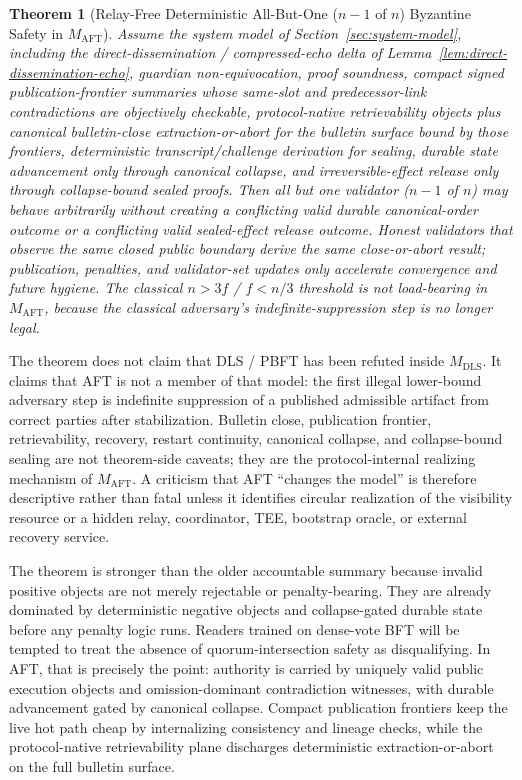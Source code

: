 \documentclass[11pt]{article}
\newtheorem{theorem}{Theorem}
\newcommand{\AFT}{\textsc{AFT}}
\begin{document}
\begin{theorem}[Relay-Free Deterministic All-But-One (\(n-1\) of \(n\)) Byzantine Safety in \(M_{\mathrm{AFT}}\)]
Assume the system model of Section~\ref{sec:system-model}, including the
direct-dissemination / compressed-echo delta of
Lemma~\ref{lem:direct-dissemination-echo}, guardian
non-equivocation, proof soundness, compact signed publication-frontier
summaries whose same-slot and predecessor-link contradictions are objectively
checkable, protocol-native retrievability objects plus canonical
bulletin-close extraction-or-abort for the bulletin surface bound by those
frontiers,
deterministic transcript/challenge derivation for sealing, durable state
advancement only through canonical collapse, and irreversible-effect release
only through collapse-bound sealed proofs. Then all but one validator
(\(n-1\) of \(n\))
may behave arbitrarily without creating a conflicting valid durable
canonical-order outcome or a conflicting valid sealed-effect release outcome.
Honest validators that observe the same closed public boundary derive the same
close-or-abort result; publication, penalties, and validator-set updates only
accelerate convergence and future hygiene. The classical \(n > 3f\) /
\(f < n/3\) threshold is not load-bearing in \(M_{\mathrm{AFT}}\), because the
classical adversary's indefinite-suppression step is no longer legal.
\end{theorem}

The theorem does not claim that DLS / PBFT has been refuted inside
\(M_{\mathrm{DLS}}\). It claims that \AFT{} is not a member of that model:
the first illegal lower-bound adversary step is indefinite suppression of a
published admissible artifact from correct parties after stabilization.
Bulletin close, publication frontier, retrievability, recovery, restart
continuity, canonical collapse, and collapse-bound sealing are not
theorem-side caveats; they are the protocol-internal realizing mechanism of
\(M_{\mathrm{AFT}}\). A criticism that \AFT{} ``changes the model'' is therefore
descriptive rather than fatal unless it identifies circular realization of the
visibility resource or a hidden relay, coordinator, TEE, bootstrap oracle, or
external recovery service.

The theorem is stronger than the older accountable summary because
invalid positive objects are not merely rejectable or penalty-bearing. They are
already dominated by deterministic negative objects and collapse-gated durable
state before any penalty logic runs.
Readers trained on dense-vote BFT will be tempted to treat the absence of
quorum-intersection safety as disqualifying. In \AFT{}, that is precisely the
point: authority is carried by uniquely valid public execution objects and
omission-dominant contradiction witnesses, with durable advancement gated by
canonical collapse.
Compact publication frontiers keep the live hot path cheap by internalizing
consistency and lineage checks, while the protocol-native retrievability plane
discharges deterministic extraction-or-abort on the full bulletin surface.
\end{document}

